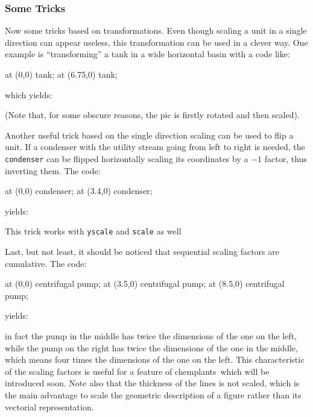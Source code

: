 \documentclass[12pt]{article}						%
\newcommand*{\chpp}[1]{\texttt{#1}}				%
\newcommand*{\chemplants}{chemplants}
\begin{document}
\subsubsection{Some Tricks}

Now some tricks based on transformations. Even though scaling a unit in a single
direction can appear useless, this transformation can be used in a clever way.
One example is ``transforming'' a tank in a wide horizontal basin with a code
like:
\begin{chpcode}
	\pic at (0,0) {tank};
	\pic[xscale=2.5, yscale=1.25, rotate=90] at (6.75,0) {tank};
\end{chpcode}
which yields:
\begin{center}
\end{center}
(Note that, for some obscure reasons, the pic is firstly rotated and then
scaled).

Another useful trick based on the single direction scaling can be used to flip a
unit. If a condenser with the utility stream going from left to right is needed,
the \chpp{condenser} can be flipped horizontally scaling its coordinates by
a $- 1$ factor, thus inverting them. The code:
\begin{chpcode}
	\pic at (0,0) {condenser};
	\pic[xscale=-1] at (3.4,0) {condenser};
\end{chpcode}
yields:
\begin{center}
\end{center}
This trick works with \verb|yscale| and \verb|scale| as well

Last, but not least, it should be noticed that sequential scaling factors are
cumulative. The code:
\begin{chpcode}
	\pic at (0,0) {centrifugal pump};
	\pic[scale=2] at (3.5,0) {centrifugal pump};
	\pic[scale=2, scale=2] at (8.5,0) {centrifugal pump};
\end{chpcode}
yields:
\begin{center}
\end{center}
in fact the pump in the middle has twice the dimensions of the one on the left,
while the pump on the right has twice the dimensions of the one in the middle,
which means four times the dimensions of the one on the left. This
characteristic of the scaling factors is useful for a feature of \chemplants\
which will be introduced soon. Note also that the thickness of the lines is not
scaled, which is the main advantage to scale the geometric description of a
figure rather than its vectorial representation.
\end{document}
